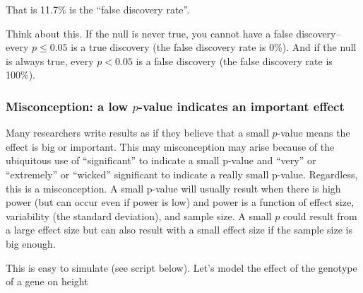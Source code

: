 \documentclass[]{book}
\newenvironment{Shaded}{\begin{snugshade}}{\end{snugshade}}
\newcommand{\KeywordTok}[1]{\textcolor[rgb]{0.13,0.29,0.53}{\textbf{#1}}}
\newcommand{\DataTypeTok}[1]{\textcolor[rgb]{0.13,0.29,0.53}{#1}}
\newcommand{\DecValTok}[1]{\textcolor[rgb]{0.00,0.00,0.81}{#1}}
\newcommand{\FloatTok}[1]{\textcolor[rgb]{0.00,0.00,0.81}{#1}}
\newcommand{\StringTok}[1]{\textcolor[rgb]{0.31,0.60,0.02}{#1}}
\newcommand{\OperatorTok}[1]{\textcolor[rgb]{0.81,0.36,0.00}{\textbf{#1}}}
\newcommand{\NormalTok}[1]{#1}
\theoremstyle{definition}
\theoremstyle{definition}
\theoremstyle{definition}
\theoremstyle{remark}
\begin{document}
That is 11.7\% is the ``false discovery rate''.

Think about this. If the null is never true, you cannot have a false
discovery--every \(p \le 0.05\) is a true discovery (the false discovery
rate is 0\%). And if the null is always true, every \(p < 0.05\) is a
false discovery (the false discovery rate is 100\%).

\subsubsection{\texorpdfstring{Misconception: a low \(p\)-value
indicates an important
effect}{Misconception: a low p-value indicates an important effect}}\label{misconception-a-low-p-value-indicates-an-important-effect}

Many researchers write results as if they believe that a small
\(p\)-value means the effect is big or important. This may misconception
may arise because of the ubiquitous use of ``significant'' to indicate a
small p-value and ``very'' or ``extremely'' or ``wicked'' significant to
indicate a really small p-value. Regardless, this is a misconception. A
small p-value will usually result when there is high power (but can
occur even if power is low) and power is a function of effect size,
variability (the standard deviation), and sample size. A small \(p\)
could result from a large effect size but can also result with a small
effect size if the sample size is big enough.

This is easy to simulate (see script below). Let's model the effect of
the genotype of a gene on height

\begin{Shaded}
\end{Shaded}
\end{document}

